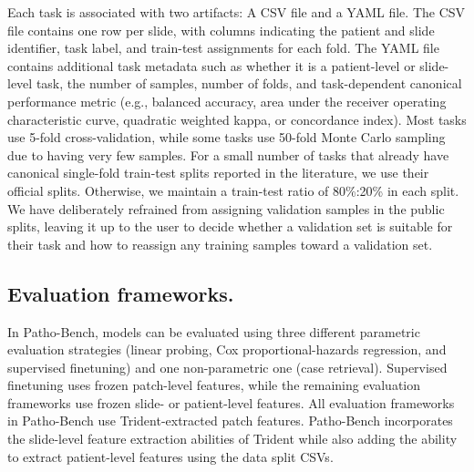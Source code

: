 Each task is associated with two artifacts: A CSV file and a YAML file. The CSV file contains one row per slide, with columns indicating the patient and slide identifier, task label, and train-test assignments for each fold. The YAML file contains additional task metadata such as whether it is a patient-level or slide-level task, the number of samples, number of folds, and task-dependent canonical performance metric (e.g., balanced accuracy, area under the receiver operating characteristic curve, quadratic weighted kappa, or concordance index). Most tasks use 5-fold cross-validation, while some tasks use 50-fold Monte Carlo sampling due to having very few samples. For a small number of tasks that already have canonical single-fold train-test splits reported in the literature, we use their official splits. Otherwise, we maintain a train-test ratio of 80\%:20\% in each split. We have deliberately refrained from assigning validation samples in the public splits, leaving it up to the user to decide whether a validation set is suitable for their task and how to reassign any training samples toward a validation set. 

\subsection{Evaluation frameworks.}
In Patho-Bench, models can be evaluated using three different parametric evaluation strategies (linear probing, Cox proportional-hazards regression, and supervised finetuning) and one non-parametric one (case retrieval). Supervised finetuning uses frozen patch-level features, while the remaining evaluation frameworks use frozen slide- or patient-level features. All evaluation frameworks in Patho-Bench use Trident-extracted patch features. Patho-Bench incorporates the slide-level feature extraction abilities of Trident while also adding the ability to extract patient-level features using the data split CSVs.

